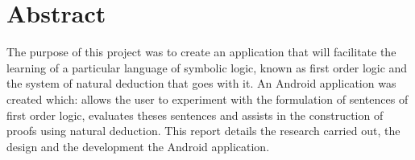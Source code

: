 
\chapter*{Abstract}

The purpose of this project was to create an application that will facilitate the learning of a particular language of symbolic logic, known as first order logic and the system of natural deduction that goes with it. An Android application was created which: allows the user to experiment with the formulation of sentences of first order logic, evaluates theses sentences and assists in the construction of proofs using natural deduction. This report details the research carried out, the design and the development the Android application.